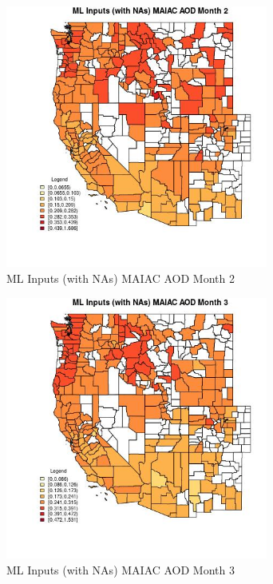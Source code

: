 \begin{figure} 
\centering  
\includegraphics[width=0.77\textwidth]{Code_Outputs/Report_ML_input_PM25_Step4_part_f_de_duplicated_aves_prioritize_24hr_obswNAs_CountyMAIAC_AODmedianMonth2.jpg} 
\caption{\label{fig:Report_ML_input_PM25_Step4_part_f_de_duplicated_aves_prioritize_24hr_obswNAsCountyMAIAC_AODmedianMonth2}ML Inputs (with NAs) MAIAC AOD Month 2} 
\end{figure} 
 

\begin{figure} 
\centering  
\includegraphics[width=0.77\textwidth]{Code_Outputs/Report_ML_input_PM25_Step4_part_f_de_duplicated_aves_prioritize_24hr_obswNAs_CountyMAIAC_AODmedianMonth3.jpg} 
\caption{\label{fig:Report_ML_input_PM25_Step4_part_f_de_duplicated_aves_prioritize_24hr_obswNAsCountyMAIAC_AODmedianMonth3}ML Inputs (with NAs) MAIAC AOD Month 3} 
\end{figure} 
 

